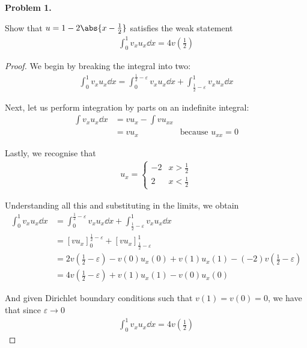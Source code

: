 \textbf{Problem 1.}

Show that $u=1-2\abs{x-\frac{1}{2}}$ satisfies the weak statement
\begin{align*}
    \int_0^1 v_xu_x \dd{x} = 4v(\tfrac{1}{2})
\end{align*}

\begin{proof}
We begin by breaking the integral into two:
\begin{align*}
    \int_0^1 v_xu_x \dd{x}
    = \int_0^{\tfrac{1}{2}-\varepsilon} v_xu_x \dd{x}
    + \int_{\tfrac{1}{2}-\varepsilon}^1 v_xu_x \dd{x}
\end{align*}

Next, let us perform integration by parts on an indefinite integral:
\begin{align*}
    \int v_xu_x \dd{x} &= vu_x - \int v u_{xx} \\
    &= vu_x & \text{because $u_{xx} = 0$}
\end{align*}

Lastly, we recognise that
\begin{align*}
    u_x = \begin{cases}
    -2 & x > \tfrac{1}{2} \\
     2 & x < \tfrac{1}{2}
    \end{cases}
\end{align*}

Understanding all this and substituting in the limits, we obtain
\begin{align*}
    \int_0^1 v_xu_x \dd{x}
    &= \int_0^{\tfrac{1}{2}-\varepsilon} v_xu_x \dd{x}
    + \int_{\tfrac{1}{2}-\varepsilon}^1 v_xu_x \dd{x} \\
    &= [vu_x]_0^{\tfrac{1}{2}-\varepsilon} + [vu_x]_{\tfrac{1}{2}-\varepsilon}^1 \\
    &= 2v(\tfrac{1}{2}-\varepsilon) - v(0)u_x(0)
    + v(1)u_x(1) - (-2)v(\tfrac{1}{2}-\varepsilon) \\
    &= 4v(\tfrac{1}{2}-\varepsilon) + v(1)u_x(1) - v(0)u_x(0)
\end{align*}

And given Dirichlet boundary conditions such that $v(1) = v(0) = 0$, we have that since $\varepsilon\rightarrow0$
\begin{align*}
    \int_0^1 v_xu_x \dd{x} = 4v(\tfrac{1}{2})
\end{align*}
\end{proof}